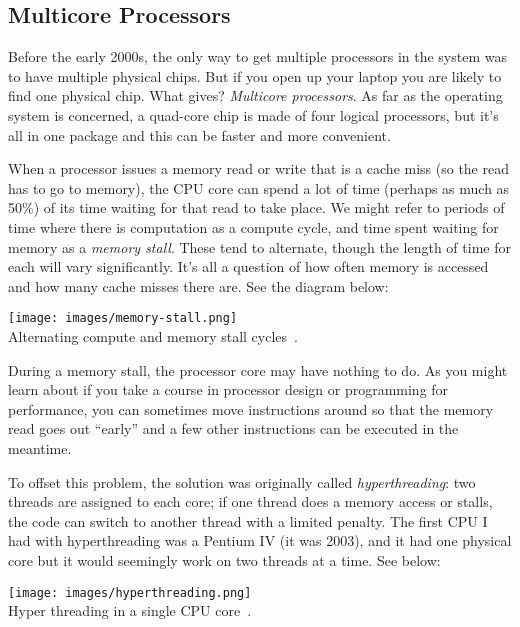 \subsection*{Multicore Processors}
Before the early 2000s, the only way to get multiple processors in the system was to have multiple physical chips. But if you open up your laptop you are likely to find one physical chip. What gives? \textit{Multicore processors}. As far as the operating system is concerned, a quad-core chip is made of four logical processors, but it's all in one package and this can be faster and more convenient.

When a processor issues a memory read or write that is a cache miss (so the read has to go to memory), the CPU core can spend a lot of time (perhaps as much as 50\%) of its time waiting for that read to take place. We might refer to periods of time where there is computation as a compute cycle, and time spent waiting for memory as a \textit{memory stall}. These tend to alternate, though the length of time for each will vary significantly. It's all a question of how often memory is accessed and how many cache misses there are. See the diagram below:

\begin{center}
	\texttt{[image: images/memory-stall.png]}\\
	Alternating compute and memory stall cycles~\cite{osc}.
\end{center}

During a memory stall, the processor core may have nothing to do. As you might learn about if you take a course in processor design or programming for performance, you can sometimes move instructions around so that the memory read goes out ``early'' and a few other instructions can be executed in the meantime. 

To offset this problem, the solution was originally called \textit{hyperthreading}: two threads are assigned to each core; if one thread does a memory access or stalls, the code can switch to another thread with a limited penalty. The first CPU I had with hyperthreading was a Pentium IV (it was 2003), and it had one physical core but it would seemingly work on two threads at a time. See below:

\begin{center}
	\texttt{[image: images/hyperthreading.png]}\\
	Hyper threading in a single CPU core~\cite{osc}.
\end{center}

